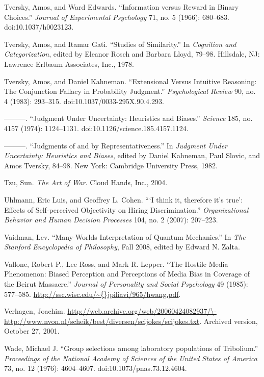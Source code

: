 {
 Tversky, Amos, and Ward Edwards. ``Information
versus Reward in Binary Choices.'' \textit{Journal of
Experimental Psychology} 71, no. 5 (1966): 680--683.
doi:10.1037/h0023123.}

{
 Tversky, Amos, and Itamar Gati. ``Studies of
Similarity.'' In \textit{Cognition and
Categorization}, edited by Eleanor Rosch and Barbara Lloyd, 79--98.
Hillsdale, NJ: Lawrence Erlbaum Associates, Inc., 1978.}

{
 Tversky, Amos, and Daniel Kahneman. ``Extensional
Versus Intuitive Reasoning: The Conjunction Fallacy in Probability
Judgment.'' \textit{Psychological Review} 90, no. 4
(1983): 293--315. doi:10.1037/0033-295X.90.4.293.}

{
 {}---{}---{}---. ``Judgment Under Uncertainty:
Heuristics and Biases.'' \textit{Science} 185, no.
4157 (1974): 1124--1131. doi:10.1126/science.185.4157.1124.}

{
 {}---{}---{}---. ``Judgments of and by
Representativeness.'' In \textit{Judgment Under
Uncertainty: Heuristics and Biases}, edited by Daniel Kahneman, Paul
Slovic, and Amos Tversky, 84--98. New York: Cambridge University Press,
1982.}

{
 Tzu, Sun. \textit{The Art of War}. Cloud Hands, Inc., 2004.}

{
 Uhlmann, Eric Luis, and Geoffrey L. Cohen.
```I think it, therefore
it's true': Effects of Self-perceived
Objectivity on Hiring Discrimination.''
\textit{Organizational Behavior and Human Decision Processes} 104, no.
2 (2007): 207--223.}

{
 Vaidman, Lev. ``Many-Worlds Interpretation of
Quantum Mechanics.'' In \textit{The Stanford
Encyclopedia of Philosophy}, Fall 2008, edited by Edward N. Zalta.}

{
 Vallone, Robert P., Lee Ross, and Mark R. Lepper.
``The Hostile Media Phenomenon: Biased Perception and
Perceptions of Media Bias in Coverage of the Beirut
Massacre.'' \textit{Journal of Personality and Social
Psychology} 49 (1985): 577--585.
\url{http://ssc.wisc.edu/\~{}jpiliavi/965/hwang.pdf}.}

{
 Verhagen, Joachim.
\url{http://web.archive.org/web/20060424082937/\-http://www.nvon.nl/scheik/best/diversen/scijokes/scijokes.txt}.
Archived version, October 27, 2001.}

{
 Wade, Michael J. ``Group selections among
laboratory populations of Tribolium.''
\textit{Proceedings of the National Academy of Sciences of the United
States of America} 73, no. 12 (1976): 4604--4607.
doi:10.1073/pnas.73.12.4604.}

